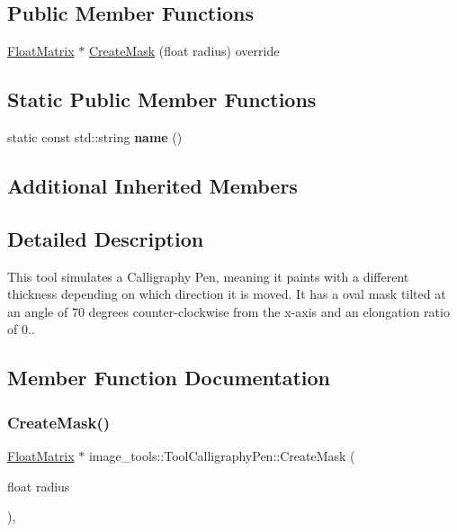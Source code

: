 \subsection*{Public Member Functions}
\begin{DoxyCompactItemize}
\item 
\hyperlink{classimage__tools_1_1FloatMatrix}{Float\+Matrix} $\ast$ \hyperlink{classimage__tools_1_1ToolCalligraphyPen_a02a5785e1fabcc142a03509ac50dfb94}{Create\+Mask} (float radius) override
\end{DoxyCompactItemize}
\subsection*{Static Public Member Functions}
\begin{DoxyCompactItemize}
\item 
\mbox{\label{classimage__tools_1_1ToolCalligraphyPen_acba5aa1019ec3c48cc3a3854e0e5bf55}} 
static const std\+::string {\bfseries name} ()
\end{DoxyCompactItemize}
\subsection*{Additional Inherited Members}


\subsection{Detailed Description}
This tool simulates a Calligraphy Pen, meaning it paints with a different thickness depending on which direction it is moved. It has a oval mask tilted at an angle of 70 degrees counter-\/clockwise from the x-\/axis and an elongation ratio of 0.. 

\subsection{Member Function Documentation}
\mbox{\label{classimage__tools_1_1ToolCalligraphyPen_a02a5785e1fabcc142a03509ac50dfb94}} 
\subsubsection{\texorpdfstring{Create\+Mask()}{CreateMask()}}
{\footnotesize\ttfamily \hyperlink{classimage__tools_1_1FloatMatrix}{Float\+Matrix} $\ast$ image\+\_\+tools\+::\+Tool\+Calligraphy\+Pen\+::\+Create\+Mask (\begin{DoxyParamCaption}\item[{float}]{radius }\end{DoxyParamCaption})\hspace{0.3cm}{\ttfamily [override]}, {\ttfamily [virtual]}}

